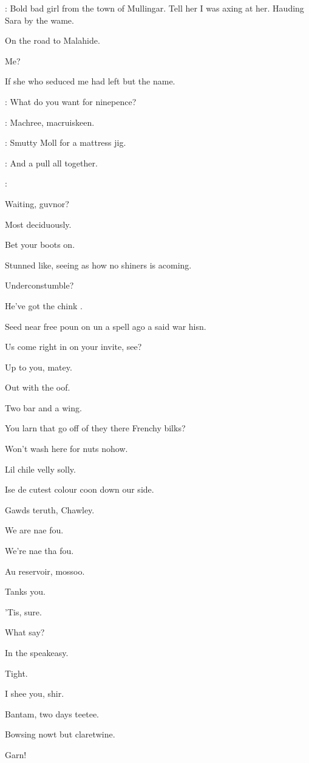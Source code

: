 \documentclass[12pt]{article}
\begin{document}
\Ba: Bold bad girl from the town of Mullingar.
Tell her I was axing at her.
Hauding Sara by the wame.

On the road to Malahide.

Me?

If she who seduced me had left but the name.

\Ln: What do you want for ninepence?

\SD: Machree, macruiskeen.

\Ly: Smutty Moll for a mattress jig.

\PC: And a pull all together.

\All: 


Waiting, guvnor?

Most deciduously.

Bet your boots on.

Stunned like, seeing as how no shiners is acoming.

Underconstumble?

He've got the chink .

Seed near free poun on un a spell ago a said war hisn.

Us come right in on your invite, see?

Up to you, matey.

Out with the oof.

Two bar and a wing.

You larn that go off of they there Frenchy bilks?

Won't wash here for nuts nohow.

Lil chile velly solly.

Ise de cutest colour coon down our side.

Gawds teruth, Chawley.

We are nae fou.

We're nae tha fou.

Au reservoir, mossoo.

Tanks you.


'Tis, sure.

What say?

In the speakeasy.

Tight.

I shee you, shir.

Bantam, two days teetee.

Bowsing nowt but claretwine.

Garn!
\end{document}
